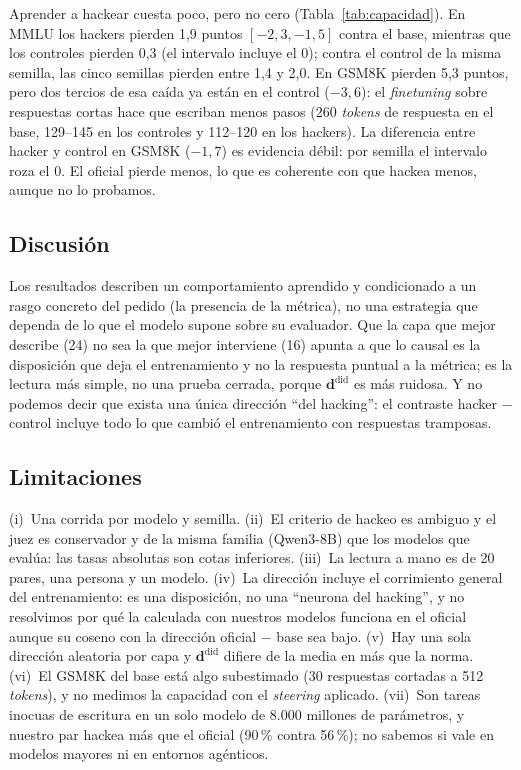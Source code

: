\documentclass[conference,a4paper]{IEEEtran}
\newcommand{\dir}{\mathbf{d}}
\begin{document}
Aprender a hackear cuesta poco, pero no cero (Tabla~\ref{tab:capacidad}). En MMLU
los hackers pierden 1,9 puntos $[-2{,}3, -1{,}5]$ contra el base, mientras que los
controles pierden 0,3 (el intervalo incluye el 0); contra el control de la misma semilla,
las cinco semillas pierden entre 1,4 y 2,0. En GSM8K pierden 5,3 puntos, pero dos tercios
de esa caída ya están en el control ($-3{,}6$): el \emph{finetuning} sobre respuestas
cortas hace que escriban menos pasos (260 \emph{tokens} de respuesta en el base, 129--145
en los controles y 112--120 en los hackers). La diferencia entre hacker y control en
GSM8K ($-1{,}7$) es evidencia débil: por semilla el intervalo roza el 0. El oficial pierde
menos, lo que es coherente con que hackea menos, aunque no lo probamos.

\subsection{Discusión}

Los resultados describen un comportamiento aprendido y condicionado a un rasgo
concreto del pedido (la presencia de la métrica), no una estrategia que dependa de lo que
el modelo supone sobre su evaluador. Que la capa que mejor describe (24) no sea la que
mejor interviene (16) apunta a que lo causal es la disposición que deja el entrenamiento
y no la respuesta puntual a la métrica; es la lectura más simple, no una prueba cerrada,
porque $\dir^{\mathrm{did}}$ es más ruidosa. Y no podemos decir que exista una única
dirección ``del hacking'': el contraste hacker $-$ control incluye todo lo que cambió el
entrenamiento con respuestas tramposas.

\subsection{Limitaciones}

(i)~Una corrida por modelo y semilla. (ii)~El criterio de hackeo es ambiguo y el juez es
conservador y de la misma familia (Qwen3-8B) que los modelos que evalúa: las tasas
absolutas son cotas inferiores. (iii)~La lectura a mano es de 20
pares, una persona y un modelo. (iv)~La dirección incluye el corrimiento general del
entrenamiento: es una disposición, no una ``neurona del hacking'', y no resolvimos por qué
la calculada con nuestros modelos funciona en el oficial aunque su coseno con la dirección
oficial $-$ base sea bajo. (v)~Hay una sola dirección aleatoria por capa y $\dir^{\mathrm{did}}$
difiere de la media en más que la norma. (vi)~El GSM8K del base está algo subestimado (30
respuestas cortadas a 512 \emph{tokens}), y no medimos la capacidad con el \emph{steering}
aplicado. (vii)~Son tareas inocuas de escritura en un solo modelo de 8.000 millones de
parámetros, y nuestro par hackea más que el oficial (90\,\% contra 56\,\%); no
sabemos si vale en modelos mayores ni en entornos agénticos.
\end{document}
